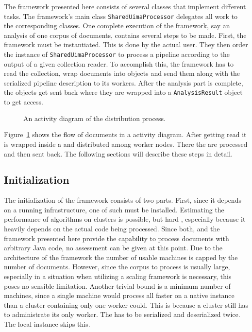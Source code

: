The framework presented here consists of several classes that implement different tasks. The framework's main class \lstinline|SharedUimaProcessor| delegates all work to the corresponding classes. One complete execution of the framework, say an analysis of one corpus of documents, contains several steps to be made. First, the framework must be instantiated. This is done by the actual user. They then order the instance of \lstinline|SharedUimaProcessor| to process a pipeline according to the output of a given collection reader. To accomplish this, the framework has to read the collection, wrap documents into \cas{} objects and send them along with the serialized pipeline description to its workers. After the analysis part is complete, the \cas{} objects get sent back where they are wrapped into a \lstinline|AnalysisResult| object to get access. 
\begin{figure}[!htb]
	\centering
	\resizebox{0.8\linewidth}{!}{\small}
	\caption[An UML activity diagram of the CAS distribution process.]{An \uml{} activity diagram of the \cas{} distribution process.}
	\label{fig:sup_act}
\end{figure}

Figure~\ref{fig:sup_act} shows the flow of documents in a \uml{} activity diagram. After getting read it is wrapped inside a \cas{} and distributed among worker nodes. There the \cas{} are processed and then sent back. The following sections will describe these steps in detail.

\subsection{Initialization}
\label{sec:init}
The initialization of the framework consists of two parts. First, since it depends on a running \spark{} infrastructure, one of such must be installed. Estimating the performance of algorithms on \spark{} clusters is possible, but hard \cite{wang2015performance,gopalani2015comparing}, especially because it heavily depends on the actual code being processed. Since both, \uima{} and the framework presented here provide the capability to process documents with arbitrary Java code, no assessment can be given at this point. Due to the architecture of the framework the number of usable machines is capped by the number of documents. However, since the corpus to process is usually large, especially in a situation when utilizing a scaling framework is necessary, this poses no sensible limitation. Another trivial bound is a minimum number of machines, since a single machine would process all \cas{} faster on a native \uima{} instance than a \spark{} cluster containing only one worker could. This is because a \spark{} cluster still has to administrate its only worker. The \cas{} has to be serialized and deserialized twice. The local \uima{} instance skips this.

